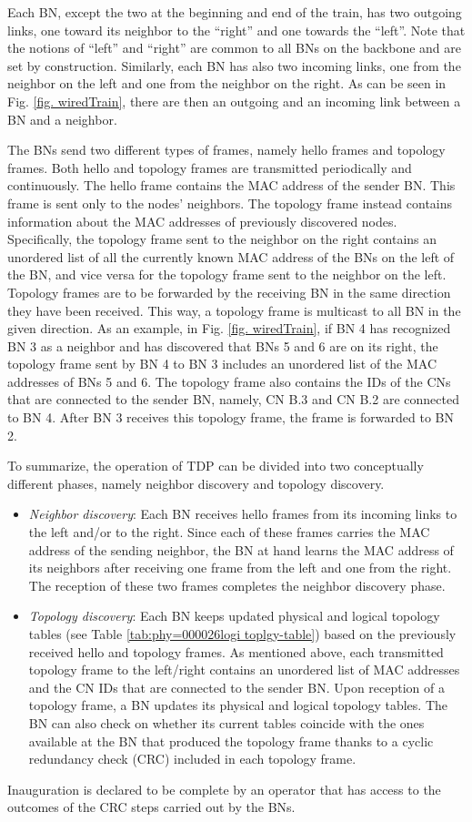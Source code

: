 \documentclass[10pt,english,two column]{IEEEtran}
\begin{document}
Each BN, except the two at the beginning and end of the train, has
two outgoing links, one toward its neighbor to the ``right'' and
one towards the ``left''. Note that the notions of ``left'' and
``right'' are common to all BNs on the backbone and are set by construction.
Similarly, each BN has also two incoming links, one from the neighbor
on the left and one from the neighbor on the right. As can be seen
in Fig. \ref{fig. wiredTrain}, there are then an outgoing and an
incoming link between a BN and a neighbor.

The BNs send two different types of frames, namely hello frames and
topology frames. Both hello and topology frames are transmitted periodically
and continuously. The hello frame contains the MAC address of the
sender BN. This frame is sent only to the nodes' neighbors. The topology
frame instead contains information about the MAC addresses of previously
discovered nodes. Specifically, the topology frame sent to the neighbor
on the right contains an unordered list of all the currently known
MAC address of the BNs on the left of the BN, and vice versa for the
topology frame sent to the neighbor on the left. Topology frames are
to be forwarded by the receiving BN in the same direction they have
been received. This way, a topology frame is multicast to all BN in
the given direction. As an example, in Fig. \ref{fig. wiredTrain},
if BN 4 has recognized BN 3 as a neighbor and has discovered that
BNs 5 and 6 are on its right, the topology frame sent by BN 4 to BN
3 includes an unordered list of the MAC addresses of BNs 5 and 6.
The topology frame also contains the IDs of the CNs that are connected
to the sender BN, namely, CN B.3 and CN B.2 are connected to BN 4.
After BN 3 receives this topology frame, the frame is forwarded to
BN 2.

To summarize, the operation of TDP can be divided into two conceptually
different phases, namely neighbor discovery and topology discovery.
\begin{itemize}
\item \emph{Neighbor discovery}: Each BN receives hello frames from its
incoming links to the left and/or to the right. Since each of these
frames carries the MAC address of the sending neighbor, the BN at
hand learns the MAC address of its neighbors after receiving one frame
from the left and one from the right. The reception of these two frames
completes the neighbor discovery phase.
\item \emph{Topology discovery}: Each BN keeps updated physical and logical
topology tables (see Table \ref{tab:phy=000026logi toplgy-table})
based on the previously received hello and topology frames. As mentioned
above, each transmitted topology frame to the left/right contains
an unordered list of MAC addresses and the CN IDs that are connected
to the sender BN. Upon reception of a topology frame, a BN updates
its physical and logical topology tables. The BN can also check on
whether its current tables coincide with the ones available at the
BN that produced the topology frame thanks to a cyclic redundancy
check (CRC) included in each topology frame.
\end{itemize}
Inauguration is declared to be complete by an operator that has access
to the outcomes of the CRC steps carried out by the BNs. 
\end{document}
